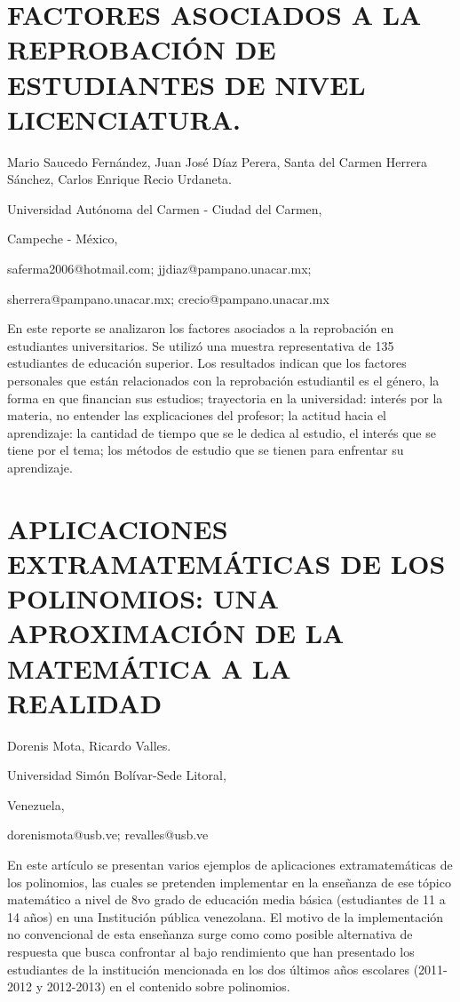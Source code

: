\section{FACTORES ASOCIADOS A LA REPROBACIÓN DE ESTUDIANTES DE NIVEL LICENCIATURA.}

\begin{datos}

Mario Saucedo Fernández, Juan José Díaz Perera, Santa del Carmen Herrera
Sánchez, Carlos Enrique Recio Urdaneta.

Universidad Autónoma del Carmen - Ciudad del Carmen,

Campeche - México,

saferma2006@hotmail.com; jjdiaz@pampano.unacar.mx;

sherrera@pampano.unacar.mx; crecio@pampano.unacar.mx

\end{datos}

En este reporte se analizaron los factores asociados a la reprobación
en estudiantes universitarios. Se utilizó una muestra representativa
de 135 estudiantes de educación superior. Los resultados indican que
los factores personales que están relacionados con la reprobación
estudiantil es el género, la forma en que financian sus estudios;
trayectoria en la universidad: interés por la materia, no entender
las explicaciones del profesor; la actitud hacia el aprendizaje: la
cantidad de tiempo que se le dedica al estudio, el interés que se
tiene por el tema; los métodos de estudio que se tienen para enfrentar
su aprendizaje. 


\section{APLICACIONES EXTRAMATEMÁTICAS DE LOS POLINOMIOS: UNA APROXIMACIÓN
DE LA MATEMÁTICA A LA REALIDAD}

\begin{datos}

Dorenis Mota, Ricardo Valles.

Universidad Simón Bolívar-Sede Litoral,

Venezuela,

dorenismota@usb.ve; revalles@usb.ve

\end{datos}

En este artículo se presentan varios ejemplos de aplicaciones extramatemáticas
de los polinomios, las cuales se pretenden implementar en la enseñanza
de ese tópico matemático a nivel de 8vo grado de educación media básica
(estudiantes de 11 a 14 años) en una Institución pública venezolana.
El motivo de la implementación no convencional de esta enseñanza surge
como como posible alternativa de respuesta que busca confrontar al
bajo rendimiento que han presentado los estudiantes de la institución
mencionada en los dos últimos años escolares (2011-2012 y 2012-2013)
en el contenido sobre polinomios. 


